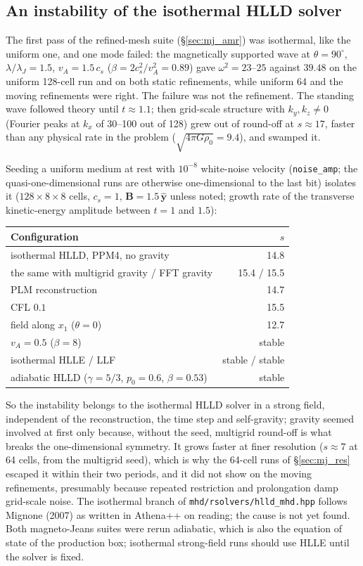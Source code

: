 \documentclass[11pt]{article}
\newcommand{\code}[1]{\texttt{#1}}
\newcommand{\file}[1]{\texttt{#1}}
\begin{document}
\subsection{An instability of the isothermal HLLD solver}
\label{sec:isohlld}

The first pass of the refined-mesh suite (\S\ref{sec:mj_amr}) was isothermal, like the
uniform one, and one mode failed: the magnetically supported wave at $\theta = 90^\circ$,
$\lambda/\lambda_J = 1.5$, $v_A = 1.5\,c_s$ ($\beta = 2c_s^2/v_A^2 = 0.89$) gave
$\omega^2 = 23$--$25$ against $39.48$ on the uniform 128-cell run and on both static
refinements, while uniform 64 and the moving refinements were right. The failure was not
the refinement. The standing wave followed theory until $t \approx 1.1$; then grid-scale
structure with $k_y, k_z \neq 0$ (Fourier peaks at $k_x$ of 30--100 out of 128) grew out of
round-off at $s \approx 17$, faster than any physical rate in the problem
($\sqrt{4\pi G\rho_0} = 9.4$), and swamped it.

Seeding a uniform medium at rest with $10^{-8}$ white-noise velocity (\code{noise\_amp}; the
quasi-one-dimensional runs are otherwise one-dimensional to the last bit) isolates it
($128\times8\times8$ cells, $c_s = 1$, $\mathbf B = 1.5\,\hat{\mathbf y}$ unless noted; growth
rate of the transverse kinetic-energy amplitude between $t = 1$ and $1.5$):
\begin{center}
\small
\begin{tabular}{@{}lr@{}}
\toprule
Configuration & $s$ \\
\midrule
isothermal HLLD, PPM4, no gravity & 14.8 \\
\quad the same with multigrid gravity / FFT gravity & 15.4 / 15.5 \\
\quad PLM reconstruction & 14.7 \\
\quad CFL $0.1$ & 15.5 \\
\quad field along $x_1$ ($\theta = 0$) & 12.7 \\
\quad $v_A = 0.5$ ($\beta = 8$) & stable \\
isothermal HLLE / LLF & stable / stable \\
adiabatic HLLD ($\gamma = 5/3$, $p_0 = 0.6$, $\beta = 0.53$) & stable \\
\bottomrule
\end{tabular}
\end{center}
So the instability belongs to the isothermal HLLD solver in a strong field, independent of
the reconstruction, the time step and self-gravity; gravity seemed involved at first only
because, without the seed, multigrid round-off is what breaks the one-dimensional symmetry.
It grows faster at finer resolution ($s \approx 7$ at 64 cells, from the multigrid seed),
which is why the 64-cell runs of \S\ref{sec:mj_res} escaped it within their two periods, and
it did not show on the moving refinements, presumably because repeated restriction and
prolongation damp grid-scale noise. The isothermal branch of
\file{mhd/rsolvers/hlld\_mhd.hpp} follows Mignone (2007) as written in Athena++ on reading;
the cause is not yet found. Both magneto-Jeans suites were rerun adiabatic, which is also
the equation of state of the production box; isothermal strong-field runs should use HLLE
until the solver is fixed.
\end{document}

